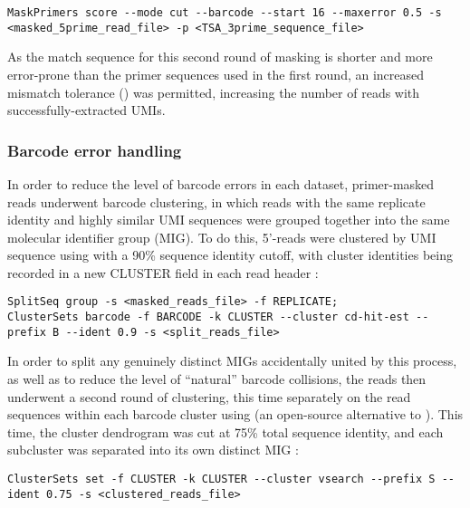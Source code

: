 \begin{lstlisting}
MaskPrimers score --mode cut --barcode --start 16 --maxerror 0.5 -s <masked_5prime_read_file> -p <TSA_3prime_sequence_file>
\end{lstlisting}

\noindent As the match sequence for this second round of masking is shorter and more error-prone than the primer sequences used in the first round, an increased mismatch tolerance () was permitted, increasing the number of reads with successfully-extracted UMIs.

\subsubsection{Barcode error handling}
\label{sec:methods_comp_igpreproc_correct}

In order to reduce the level of barcode errors in each dataset, primer-masked \igseq reads underwent barcode clustering, in which reads with the same replicate identity and highly similar UMI sequences were grouped together into the same molecular identifier group (MIG). To do this, 5'-reads were clustered by UMI sequence using   \parencite{li2006cdhit,fu2012cdhit} with a 90\% sequence identity cutoff, with cluster identities being recorded in a new CLUSTER field in each read header \parencite{vanderheiden2018perscomm}:

\begin{lstlisting}
SplitSeq group -s <masked_reads_file> -f REPLICATE;
ClusterSets barcode -f BARCODE -k CLUSTER --cluster cd-hit-est --prefix B --ident 0.9 -s <split_reads_file>
\end{lstlisting}

In order to split any genuinely distinct MIGs accidentally united by this process, as well as to reduce the level of ``natural'' barcode collisions, the reads then underwent a second round of clustering, this time separately on the read sequences within each barcode cluster using  (an open-source alternative to  \parencite{edgar2010usearch,rognes2016vsearch}).
This time, the cluster dendrogram was cut at 75\% total sequence identity, and each subcluster was separated into its own distinct MIG \parencite{vanderheiden2018perscomm}:

\begin{lstlisting}
ClusterSets set -f CLUSTER -k CLUSTER --cluster vsearch --prefix S --ident 0.75 -s <clustered_reads_file>
\end{lstlisting}

